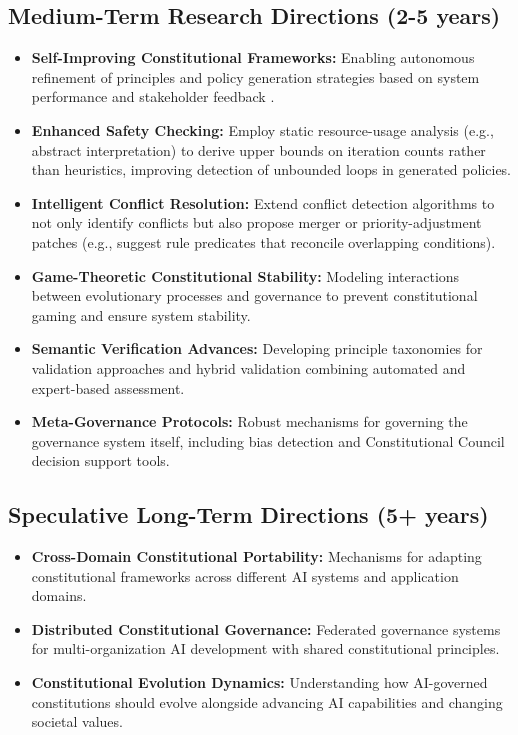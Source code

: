 \documentclass[sigconf,natbib]{acmart}
\begin{document}
\subsection{Medium-Term Research Directions (2-5 years)}
\label{subsec:medium_term_research}
\begin{itemize}
    \item \textbf{Self-Improving Constitutional Frameworks:} Enabling autonomous refinement of principles and policy generation strategies based on system performance and stakeholder feedback \cite{Zhao2025AbsoluteZero}.
    \item \textbf{Enhanced Safety Checking:} Employ static resource-usage analysis (e.g., abstract interpretation) to derive upper bounds on iteration counts rather than heuristics, improving detection of unbounded loops in generated policies.
    \item \textbf{Intelligent Conflict Resolution:} Extend conflict detection algorithms to not only identify conflicts but also propose merger or priority-adjustment patches (e.g., suggest rule predicates that reconcile overlapping conditions).
    \item \textbf{Game-Theoretic Constitutional Stability:} Modeling interactions between evolutionary processes and governance to prevent constitutional gaming and ensure system stability.
    \item \textbf{Semantic Verification Advances:} Developing principle taxonomies for validation approaches and hybrid validation combining automated and expert-based assessment.
    \item \textbf{Meta-Governance Protocols:} Robust mechanisms for governing the governance system itself, including bias detection and Constitutional Council decision support tools.
\end{itemize}

\subsection{Speculative Long-Term Directions (5+ years)}
\begin{itemize}
    \item \textbf{Cross-Domain Constitutional Portability:} Mechanisms for adapting constitutional frameworks across different AI systems and application domains.
    \item \textbf{Distributed Constitutional Governance:} Federated governance systems for multi-organization AI development with shared constitutional principles.
    \item \textbf{Constitutional Evolution Dynamics:} Understanding how AI-governed constitutions should evolve alongside advancing AI capabilities and changing societal values.
\end{itemize}
\end{document}
